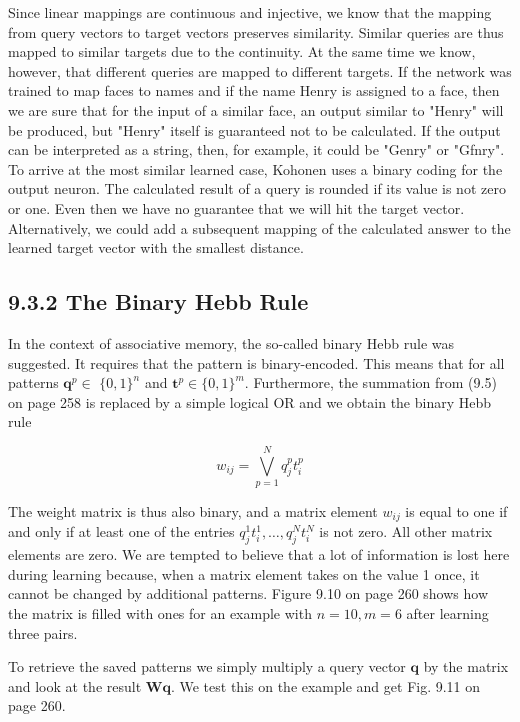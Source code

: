 \documentclass[10pt]{article}
\begin{document}
Since linear mappings are continuous and injective, we know that the mapping from query vectors to target vectors preserves similarity. Similar queries are thus mapped to similar targets due to the continuity. At the same time we know, however, that different queries are mapped to different targets. If the network was trained to map faces to names and if the name Henry is assigned to a face, then we are sure that for the input of a similar face, an output similar to "Henry" will be produced, but "Henry" itself is guaranteed not to be calculated. If the output can be interpreted as a string, then, for example, it could be "Genry" or "Gfnry". To arrive at the most similar learned case, Kohonen uses a binary coding for the output neuron. The calculated result of a query is rounded if its value is not zero or one. Even then we have no guarantee that we will hit the target vector. Alternatively, we could add a subsequent mapping of the calculated answer to the learned target vector with the smallest distance.

\subsection*{9.3.2 The Binary Hebb Rule}
In the context of associative memory, the so-called binary Hebb rule was suggested. It requires that the pattern is binary-encoded. This means that for all patterns $\boldsymbol{q}^{p} \in$ $\{0,1\}^{n}$ and $\boldsymbol{t}^{p} \in\{0,1\}^{m}$. Furthermore, the summation from (9.5) on page 258 is replaced by a simple logical OR and we obtain the binary Hebb rule


\begin{equation*}
w_{i j}=\bigvee_{p=1}^{N} q_{j}^{p} t_{i}^{p} \tag{9.10}
\end{equation*}


The weight matrix is thus also binary, and a matrix element $w_{i j}$ is equal to one if and only if at least one of the entries $q_{j}^{1} t_{i}^{1}, \ldots, q_{j}^{N} t_{i}^{N}$ is not zero. All other matrix elements are zero. We are tempted to believe that a lot of information is lost here during learning because, when a matrix element takes on the value 1 once, it cannot be changed by additional patterns. Figure 9.10 on page 260 shows how the matrix is filled with ones for an example with $n=10, m=6$ after learning three pairs.

To retrieve the saved patterns we simply multiply a query vector $\boldsymbol{q}$ by the matrix and look at the result $\boldsymbol{W} \boldsymbol{q}$. We test this on the example and get Fig. 9.11 on page 260.
\end{document}
